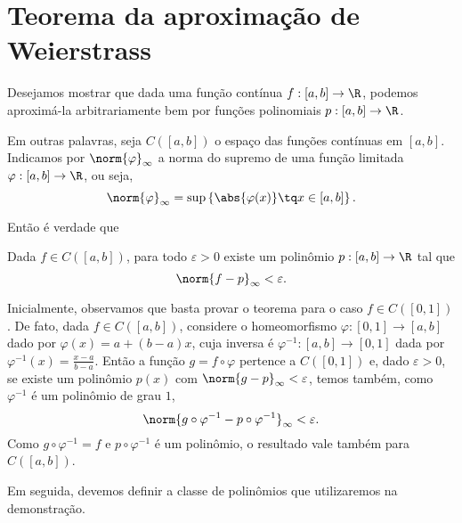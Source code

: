 
\section{Teorema da aproximação de Weierstrass}

Desejamos mostrar que dada uma função contínua \( f : [a, b] \to \R \), podemos aproximá-la arbitrariamente bem por funções polinomiais \( p : [a, b] \to \R \).

Em outras palavras, seja \( C( [a, b]) \) o espaço das funções contínuas em \( [a, b] \). Indicamos por \( \norm{ \varphi }_{ \infty } \) a norma do supremo de uma função limitada \( \varphi : [a, b] \to \R \), ou seja,
\begin{equation}
    \norm{ \varphi }_{ \infty } = \sup \left\{ \abs{ \varphi(x) } \tq x \in [a, b] \right\}
.\end{equation}

Então é verdade que

\begin{teo}
    \label{thm: weierstrass}
    Dada \( f \in C( [a, b] ) \), para todo \( \varepsilon > 0 \) existe um polinômio \( p : [a, b] \to \R \) tal que
    \begin{equation}
        \norm{ f - p }_{ \infty } < \varepsilon
    .\end{equation}
\end{teo}

Inicialmente, observamos que basta provar o teorema para o caso \( f \in C([0, 1]) \).
De fato, dada \( f \in C([a, b]) \), considere o homeomorfismo \( \varphi : [0, 1] \to [a, b] \) dado por \( \varphi(x) = a + ( b - a )x \), cuja inversa é \( \varphi^{ -1 } : [a, b] \to [0, 1] \) dada por \( \varphi^{ -1 } (x) = \frac{ x - a }{ b - a } \).
Então a função \( g = f \circ \varphi \) pertence a \( C([0, 1]) \) e, dado \( \varepsilon > 0 \), se existe um polinômio \( p(x) \) com \( \norm{ g - p }_{ \infty } < \varepsilon \), temos também, como \( \varphi^{ -1 } \) é um polinômio de grau \( 1 \),
\begin{equation}
    \norm{ g \circ \varphi^{ -1 } - p \circ \varphi^{ -1 } }_{ \infty } < \varepsilon
.\end{equation}
Como \( g \circ \varphi^{ -1 } = f \) e \( p \circ \varphi^{ -1 } \) é um polinômio, o resultado vale também para \( C([a, b]) \).

Em seguida, devemos definir a classe de polinômios que utilizaremos na demonstração.

